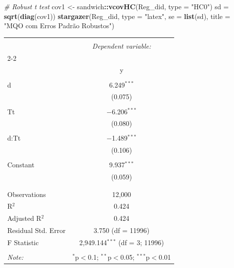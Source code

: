 \documentclass[portugues]{article}
\newenvironment{Shaded}{\begin{snugshade}}{\end{snugshade}}
\newcommand{\AttributeTok}[1]{\textcolor[rgb]{0.13,0.29,0.53}{#1}}
\newcommand{\CommentTok}[1]{\textcolor[rgb]{0.56,0.35,0.01}{\textit{#1}}}
\newcommand{\FunctionTok}[1]{\textcolor[rgb]{0.13,0.29,0.53}{\textbf{#1}}}
\newcommand{\NormalTok}[1]{#1}
\newcommand{\OtherTok}[1]{\textcolor[rgb]{0.56,0.35,0.01}{#1}}
\newcommand{\SpecialCharTok}[1]{\textcolor[rgb]{0.81,0.36,0.00}{\textbf{#1}}}
\newcommand{\StringTok}[1]{\textcolor[rgb]{0.31,0.60,0.02}{#1}}
\begin{document}
\begin{boxA}
\begin{Shaded}
\begin{Highlighting}[]
    \CommentTok{\# Robust t test}
    \NormalTok{cov1 }\OtherTok{\textless{}{-}}\NormalTok{ sandwich}\SpecialCharTok{::}\FunctionTok{vcovHC}\NormalTok{(Reg\_did, }\AttributeTok{type =} \StringTok{"HC0"}\NormalTok{)}
    \NormalTok{sd }\OtherTok{=} \FunctionTok{sqrt}\NormalTok{(}\FunctionTok{diag}\NormalTok{(cov1))}
    \FunctionTok{stargazer}\NormalTok{(Reg\_did, }\AttributeTok{type =} \StringTok{"latex"}\NormalTok{, }\AttributeTok{se =} \FunctionTok{list}\NormalTok{(sd),}
              \AttributeTok{title =} \StringTok{"MQO com Erros Padrão Robustos"}\NormalTok{)}
    \end{Highlighting}
    \end{Shaded}

\begingroup
    \fontsize{8pt}{12pt}\selectfont
    \begin{center}
    \begin{tabular}{@{\extracolsep{5pt}}lc} 
    \\[-1.8ex]\hline 
    \hline \\[-1.8ex] 
     & \multicolumn{1}{c}{\textit{Dependent variable:}} \\ 
    \cline{2-2} 
    \\[-1.8ex] & y \\ 
    \hline \\[-1.8ex] 
     d & 6.249$^{***}$ \\ 
      & (0.075) \\ 
      & \\ 
     Tt & $-$6.206$^{***}$ \\ 
      & (0.080) \\ 
      & \\ 
     d:Tt & $-$1.489$^{***}$ \\ 
      & (0.106) \\ 
      & \\ 
     Constant & 9.937$^{***}$ \\ 
      & (0.059) \\ 
      & \\ 
    \hline \\[-1.8ex] 
    Observations & 12,000 \\ 
    R$^{2}$ & 0.424 \\ 
    Adjusted R$^{2}$ & 0.424 \\ 
    Residual Std. Error & 3.750 (df = 11996) \\ 
    F Statistic & 2,949.144$^{***}$ (df = 3; 11996) \\ 
    \hline 
    \hline \\[-1.8ex] 
    \textit{Note:}  & \multicolumn{1}{r}{$^{*}$p$<$0.1; $^{**}$p$<$0.05; $^{***}$p$<$0.01} \\ 
    \end{tabular} 
    \end{center}
\endgroup



\end{boxA}
\end{document}
